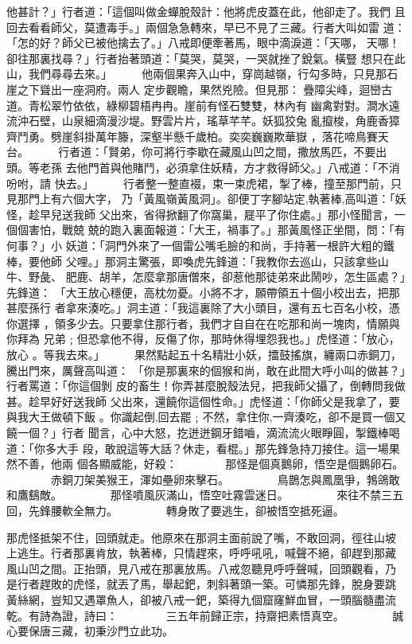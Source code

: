 \begin{pinyinscope}
{他甚計？」行者道：「這個叫做金蟬脫殼計：他將虎皮蓋在此，他卻走了。我們
且回去看看師父，莫遭毒手。」兩個急急轉來，早已不見了三藏。行者大叫如雷
道：「怎的好？師父已被他擒去了。」八戒即便牽著馬，眼中滴淚道：「天哪，
天哪！卻往那裏找尋？」行者抬著頭道：「莫哭，莫哭，一哭就挫了銳氣。橫豎
想只在此山，我們尋尋去來。」
　　
他兩個果奔入山中，穿崗越嶺，行勾多時，只見那石崖之下聳出一座洞府。兩人
定步觀瞻，果然兇險。但見那：
疊障尖峰，迴巒古道。青松翠竹依依，綠柳碧梧冉冉。崖前有怪石雙雙，林內有
幽禽對對。澗水遠流沖石壁，山泉細滴漫沙堤。野雲片片，瑤草芊芊。妖狐狡兔
亂攛梭，角鹿香獐齊鬥勇。劈崖斜掛萬年籐，深壑半懸千歲柏。奕奕巍巍欺華嶽
，落花啼鳥賽天台。
　　
行者道：「賢弟，你可將行李歇在藏風山凹之間，撒放馬匹，不要出頭。等老孫
去他門首與他賭鬥，必須拿住妖精，方才救得師父。」八戒道：「不消吩咐，請
快去。」
　　
行者整一整直裰，束一束虎裙，掣了棒，撞至那門前，只見那門上有六個大字，
乃「黃風嶺黃風洞」。卻便丁字腳站定,執著棒,高叫道：「妖怪，趁早兒送我師
父出來，省得掀翻了你窩巢，屣平了你住處。」那小怪聞言，一個個害怕，戰兢
兢的跑入裏面報道：「大王，禍事了。」那黃風怪正坐間，問：「有何事？」小
妖道：「洞門外來了一個雷公嘴毛臉的和尚，手持著一根許大粗的鐵棒，要他師
父哩。」那洞主驚張，即喚虎先鋒道：「我教你去巡山，只該拿些山牛、野彘、
肥鹿、胡羊，怎麼拿那唐僧來，卻惹他那徒弟來此鬧吵，怎生區處？」先鋒道：
「大王放心穩便，高枕勿憂。小將不才，願帶領五十個小校出去，把那甚麼孫行
者拿來湊吃。」洞主道：「我這裏除了大小頭目，還有五七百名小校，憑你選擇
，領多少去。只要拿住那行者，我們才自自在在吃那和尚一塊肉，情願與你拜為
兄弟﹔但恐拿他不得，反傷了你，那時休得埋怨我也。」虎怪道：「放心，放心
。等我去來。」
　　
果然點起五十名精壯小妖，擂鼓搖旗，纏兩口赤銅刀，騰出門來，厲聲高叫道：
「你是那裏來的個猴和尚，敢在此間大呼小叫的做甚？」行者罵道：「你這個剝
皮的畜生！你弄甚麼脫殼法兒，把我師父攝了，倒轉問我做甚。趁早好好送我師
父出來，還饒你這個性命。」虎怪道：「你師父是我拿了，要與我大王做頓下飯
。你識起倒,回去罷﹔不然，拿住你,一齊湊吃，卻不是買一個又饒一個？」行者
聞言，心中大怒，扢迸迸鋼牙錯嚙，滴流流火眼睜圓，掣鐵棒喝道：「你多大手
段，敢說這等大話？休走，看棍。」那先鋒急持刀接住。這一場果然不善，他兩
個各顯威能，好殺：
　　　　那怪是個真鵝卵，悟空是個鵝卵石。
　　　　赤銅刀架美猴王，渾如壘卵來擊石。
　　　　鳥鵲怎與鳳凰爭，鵓鴿敢和鷹鷂敵。
　　　　那怪噴風灰滿山，悟空吐霧雲迷日。
　　　　來往不禁三五回，先鋒腰軟全無力。
　　　　轉身敗了要逃生，卻被悟空抵死逼。

那虎怪抵架不住，回頭就走。他原來在那洞主面前說了嘴，不敢回洞，徑往山坡
上逃生。行者那裏肯放，執著棒，只情趕來，呼呼吼吼，喊聲不絕，卻趕到那藏
風山凹之間。正抬頭，見八戒在那裏放馬。八戒忽聽見呼呼聲喊，回頭觀看，乃
是行者趕敗的虎怪，就丟了馬，舉起鈀，刺斜著頭一築。可憐那先鋒，脫身要跳
黃絲網，豈知又遇罩魚人，卻被八戒一鈀，築得九個窟窿鮮血冒，一頭腦髓盡流
乾。有詩為證，詩曰：
　　　　三五年前歸正宗，持齋把素悟真空。
　　　　誠心要保唐三藏，初秉沙門立此功。

}
\end{pinyinscope}
